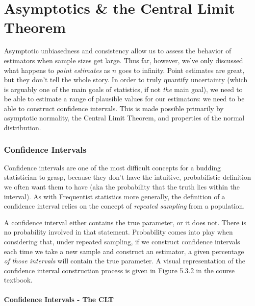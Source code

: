 \documentclass[
  letterpaper,
  DIV=11,
  numbers=noendperiod]{scrreprt}
\begin{document}

\hypertarget{asymptotics-the-central-limit-theorem}{%
\chapter{Asymptotics \& the Central Limit
Theorem}\label{asymptotics-the-central-limit-theorem}}

Asymptotic unbiasedness and consistency allow us to assess the behavior
of estimators when sample sizes get large. Thus far, however, we've only
discussed what happens to \emph{point estimates} as \(n\) goes to
infinity. Point estimates are great, but they don't tell the whole
story. In order to truly quantify uncertainty (which is arguably one of
the main goals of statistics, if not \emph{the} main goal), we need to
be able to estimate a range of plausible values for our estimators: we
need to be able to construct confidence intervals. This is made possible
primarily by asymptotic normality, the Central Limit Theorem, and
properties of the normal distribution.

\hypertarget{confidence-intervals}{%
\subsection*{Confidence Intervals}\label{confidence-intervals}}

Confidence intervals are one of the most difficult concepts for a
budding statistician to grasp, because they don't have the intuitive,
probabilistic definition we often want them to have (aka the probability
that the truth lies within the interval). As with Frequentist statistics
more generally, the definition of a confidence interval relies on the
concept of \emph{repeated sampling} from a population.

A confidence interval either contains the true parameter, or it does
not. There is no probability involved in that statement. Probability
comes into play when considering that, under repeated sampling, if we
construct confidence intervals each time we take a new sample and
construct an estimator, a given percentage \emph{of those intervals}
will contain the true parameter. A visual representation of the
confidence interval construction process is given in Figure 5.3.2 in the
course textbook.

\hypertarget{confidence-intervals---the-clt}{%
\subsubsection*{Confidence Intervals - The
CLT}\label{confidence-intervals---the-clt}}
\end{document}
